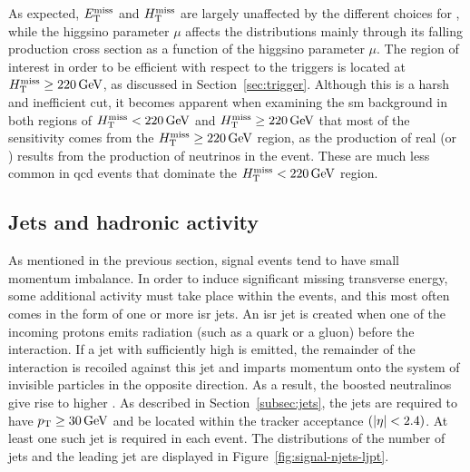 As expected, $E_{\mathrm{T}}^{\text{miss}}$ and $H_{\mathrm{T}}^{\text{miss}}$ are largely unaffected by the different choices for \dm, while the higgsino parameter $\mu$ affects the distributions mainly through its falling production cross section as a function of the higgsino parameter $\mu$. The region of interest in order to be efficient with respect to the triggers is located at $H_{\mathrm{T}}^{\text{miss}}\geq 220\,\text{Ge\hspace{-.08em}V}$, as discussed in Section~\ref{sec:trigger}. Although this is a harsh and inefficient cut, it becomes apparent when examining the \gls{sm} background in both regions of $H_{\mathrm{T}}^{\text{miss}} < 220\,\text{Ge\hspace{-.08em}V}$ and $H_{\mathrm{T}}^{\text{miss}}\geq 220\,\text{Ge\hspace{-.08em}V}$ that most of the sensitivity comes from the $H_{\mathrm{T}}^{\text{miss}}\geq 220\,\text{Ge\hspace{-.08em}V}$ region, as the production of real \mht (or \MET) results from the production of neutrinos in the event. These are much less common in \gls{qcd} events that dominate the $H_{\mathrm{T}}^{\text{miss}} < 220\,\text{Ge\hspace{-.08em}V}$ region.

\subsection{Jets and hadronic activity}

As mentioned in the previous section, signal events tend to have small momentum imbalance. In order to induce significant missing transverse energy, some additional activity must take place within the events, and this most often comes in the form of one or more \gls{isr} jets. An \gls{isr} jet is created when one of the incoming protons emits radiation (such as a quark or a gluon) before the interaction. If a jet with sufficiently high \pt is emitted, the remainder of the interaction is recoiled against this jet and imparts momentum onto the system of invisible particles in the opposite direction. As a result, the boosted neutralinos \neuto give rise to higher \mht. As described in Section~\ref{subsec:jets}, the jets are required to have $p_{\mathrm{T}} \geq 30\,\text{Ge\hspace{-.08em}V}$ and be located within the tracker acceptance $\left(\abs{\eta}<2.4\right)$. At least one such jet is required in each event. The distributions of the number of jets and the leading jet \pt are displayed in Figure~\ref{fig:signal-njets-ljpt}.

